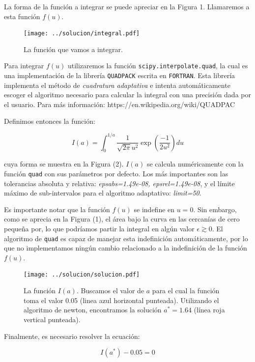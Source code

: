 \documentclass[letter, 11pt]{article}
\begin{document}
La forma de la función a integrar se puede apreciar en la Figura 1. Llamaremos
a esta función $f(u)$.

\begin{figure}[!ht]
  \centering
  \texttt{[image: ../solucion/integral.pdf]}
  \caption{La función que vamos a integrar.}
\end{figure}

Para integrar $f(u)$ utilizaremos la función \texttt{scipy.interpolate.quad},
la cual es una implementación de la librería \texttt{QUADPACK} escrita en
\texttt{FORTRAN}. Esta librería implementa el método de {\it cuadratura
adaptativa} e intenta automáticamente escoger el algoritmo necesario para
calcular la integral con una precisión dada por el usuario. Para más
información: https://en.wikipedia.org/wiki/QUADPAC

Definimos entonces la función:

\begin{equation}
  I(a) =  \int_0^{1/a} \frac{1}{\sqrt{2\pi}u^2} \exp\left({\frac{-1}{2u^2}}\right) du
\end{equation}

cuya forma se muestra en la Figura (2). $I(a)$ se calcula numéricamente con la
función \texttt{quad} con sus parámetros por defecto. Los más importantes son
las tolerancias absoluta y relativa: {\it epsabs=1.49e-08, epsrel=1.49e-08}, y
el límite máximo de sub-intervalos para el algoritmo adaptativo: {\it
limit=50}.

Es importante notar que la función $f(u)$ se indefine en $u=0$. Sin embargo,
como se aprecia en la Figura (1), el área bajo la curva en las cercanías de
cero pequeña por, lo que podríamos partir la integral en algún valor $\epsilon
\gtrsim 0$. El algoritmo de \texttt{quad} es capaz de manejar esta indefinición
automáticamente, por lo que no implementamos ningún cambio relacionado a la
indefinición de la función $f(u)$.

\begin{figure}[!hb]
  \centering
  \texttt{[image: ../solucion/solucion.pdf]}
  \caption{La función $I(a)$. Buscamos el valor de $a$ para el cual la función
  toma el valor 0.05 (linea azul horizontal punteada). Utilizando el algoritmo
de newton, encontramos la solución $a^*=1.64$ (línea roja vertical punteada).}
\end{figure}

Finalmente, es necesario resolver la ecuación:

\begin{equation}
  I(a^*) - 0.05 = 0
\end{equation}
\end{document}
